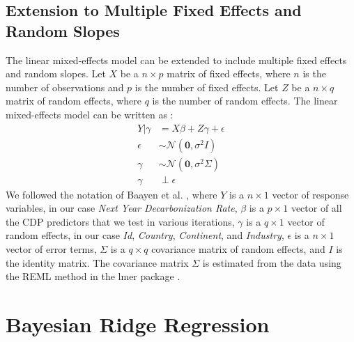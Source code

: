 \subsection{Extension to Multiple Fixed Effects and Random Slopes}
The linear mixed-effects model can be extended to include multiple fixed effects and random slopes. Let $X$ be a $n \times p$ matrix of fixed effects, where $n$ is the number of observations and $p$ is the number of fixed effects. Let $Z$ be a $n \times q$ matrix of random effects, where $q$ is the number of random effects. The linear mixed-effects model can be written as \cite{duke_sta216_lecture}:
\begin{align}
    Y|\gamma &= X\beta + Z\gamma + \epsilon \\
    \epsilon &\sim \mathcal{N}(\mathbf{0}, \sigma^2I) \\
    \gamma &\sim \mathcal{N}(\mathbf{0}, \sigma^2\Sigma) \\
    \gamma &\perp \epsilon
\end{align}
We followed the notation of Baayen et al. \cite{BAAYEN2008390}, where $Y$ is a $n \times 1$ vector of response variables, in our case \textit{Next Year Decarbonization Rate}, $\beta$ is a $p \times 1$ vector of all the CDP predictors that we test in various iterations, $\gamma$ is a $q \times 1$ vector of random effects, in our case \textit{Id}, \textit{Country}, \textit{Continent}, and \textit{Industry}, $\epsilon$ is a $n \times 1$ vector of error terms, $\Sigma$ is a $q \times q$ covariance matrix of random effects, and $I$ is the identity matrix. The covariance matrix $\Sigma$ is estimated from the data using the REML method in the lmer package \cite{bates}.




\section{Bayesian Ridge Regression}
